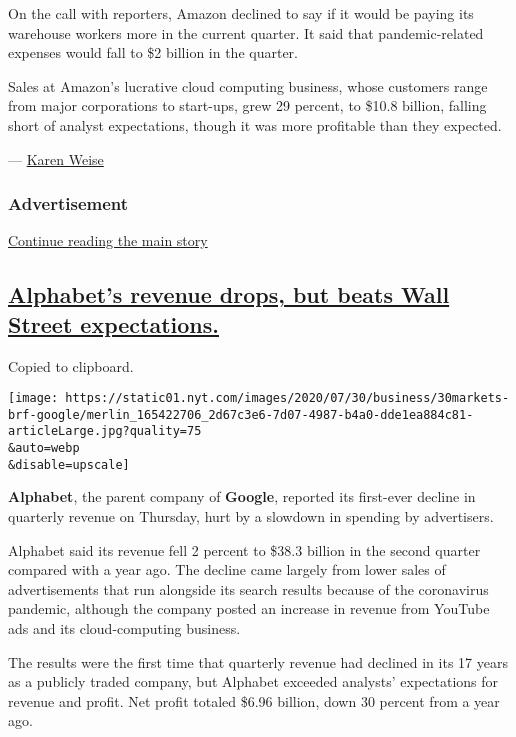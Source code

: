 On the call with reporters, Amazon declined to say if it would be paying
its warehouse workers more in the current quarter. It said that
pandemic-related expenses would fall to \$2 billion in the quarter.

Sales at Amazon's lucrative cloud computing business, whose customers
range from major corporations to start-ups, grew 29 percent, to \$10.8
billion, falling short of analyst expectations, though it was more
profitable than they expected.

--- \href{https://www.nytimes.com/by/karen-weise}{Karen Weise}

\hypertarget{advertisement}{%
\subsubsection{Advertisement}\label{advertisement}}

\protect\hyperlink{after-dfp-ad-mid1}{Continue reading the main story}

\hypertarget{alphabets-revenue-drops-but-beats-wall-street-expectations}{%
\subsection{\texorpdfstring{\protect\hyperlink{alphabets-revenue-drops-but-beats-wall-street-expectations}{Alphabet's
revenue drops, but beats Wall Street
expectations.}}{Alphabet's revenue drops, but beats Wall Street expectations.}}\label{alphabets-revenue-drops-but-beats-wall-street-expectations}}

Copied to clipboard.

\texttt{[image: https://static01.nyt.com/images/2020/07/30/business/30markets-brf-google/merlin\_165422706\_2d67c3e6-7d07-4987-b4a0-dde1ea884c81-articleLarge.jpg?quality=75\\\&auto=webp\\\&disable=upscale]}

\textbf{Alphabet}, the parent company of \textbf{Google}, reported its
first-ever decline in quarterly revenue on Thursday, hurt by a slowdown
in spending by advertisers.

Alphabet said its revenue fell 2 percent to \$38.3 billion in the second
quarter compared with a year ago. The decline came largely from lower
sales of advertisements that run alongside its search results because of
the coronavirus pandemic, although the company posted an increase in
revenue from YouTube ads and its cloud-computing business.

The results were the first time that quarterly revenue had declined in
its 17 years as a publicly traded company, but Alphabet exceeded
analysts' expectations for revenue and profit. Net profit totaled \$6.96
billion, down 30 percent from a year ago.

